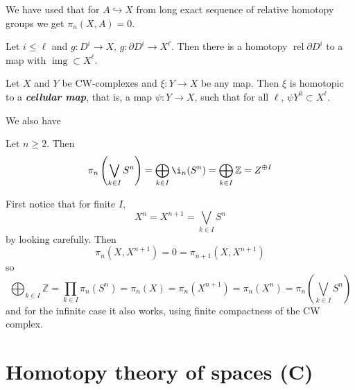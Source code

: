 \begin{remark}
	We have used that for $A\hookrightarrow X$ from long exact sequence of relative homotopy groups we get $\pi_n(X,A)=0$.
\end{remark}

\begin{coro}
	Let $i\leq \ell$ and $g: D^i\to X$, $g:\partial D^i\to X^\ell$. Then there is a homotopy $\operatorname{rel}\partial D^i$ to a map with $\operatorname{img}\subset X^\ell$.
\end{coro}

\begin{thm}
	Let $X$ and $Y$ be CW-complexes and $\xi:Y\to X$ be any map. Then $\xi$ is homotopic to a \textbf{\textit{cellular map}}, that is, a map $\psi:Y\to X$, such that for all $\ell$, $\psi Y^0\subset X^\ell$.
\end{thm}

We also have
\begin{prop}
	Let $n\geq 2$. Then 
	\[\pi_n\left(\bigvee_{k\in I}S^n\right)=\bigoplus_{k\in I}\i_n(S^n)=\bigoplus_{k\in I}\mathbb{Z}=Z^{\oplus I}\]
\end{prop}
\begin{prop}
	First notice that for finite $I$,
	\[X^n=X^{n+1}=\bigvee_{k\in I}S^n\]
	by looking carefully. Then
	\[\pi_n(X,X^{n+1})=0=\pi_{n+1}(X,X^{n+1})\]
	so
	\[\bigoplus_{k\in I}\mathbb{Z}=\prod_{k\in I}\pi_n(S^n)=\pi_n(X)=\pi_n(X^{n+1})=\pi_n(X^n)=\pi_n\left(\bigvee_{k\in I}S^n\right)\]
	and for the infinite case it also works, using finite compactness of the CW complex.
\end{prop}

\section*{Homotopy theory of spaces (C)}

